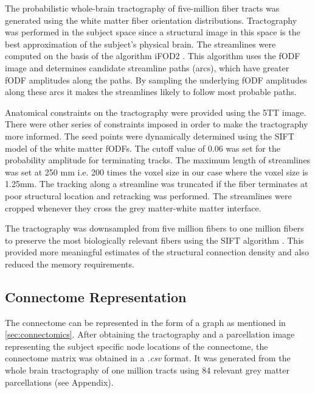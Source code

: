 \documentclass[msthesis.tex]{subfiles}
\begin{document}

The probabilistic whole-brain tractography of five-million fiber tracts was generated using the white matter fiber orientation distributions. Tractography was performed in the subject space since a structural image in this space is the best approximation of the subject's physical brain. The streamlines were computed on the basis of the algorithm iFOD2 \citep{tournier2010improved}. This algorithm uses the \gls{fODF} image and determines candidate streamline paths (arcs), which have greater \gls{fODF} amplitudes along the paths. By sampling the underlying \gls{fODF} amplitudes along these arcs it makes the streamlines likely to follow most probable paths.

Anatomical constraints on the tractography were provided using the \gls{5TT} image. There were other series of constraints imposed in order to make the  tractography more informed. The seed points were dynamically determined using the \gls{SIFT} model \citep{smith2013sift} of the white matter fODFs. The cutoff value of $0.06$ was set for the probability amplitude for terminating tracks. The maximum length of streamlines was set at 250 mm i.e. 200 times the voxel size in our case where the voxel size is 1.25mm. The tracking along a streamline was truncated if the fiber terminates at poor structural location and  retracking was performed. The streamlines were cropped whenever they cross the grey matter-white matter interface. 

The tractography was downsampled from five million fibers to one million fibers to preserve the most biologically relevant fibers using the SIFT algorithm \citep{smith2013sift}. This provided more meaningful estimates of the structural connection density and also reduced the memory requirements. 

\subsection{Connectome Representation}
\label{subsec:connectomegeneration}
The connectome can be represented in the form of a graph as mentioned in \autoref{sec:connectomics}. After obtaining the tractography and a parcellation image representing the subject specific node locations of the connectome, the connectome matrix was obtained in a \textit{.csv} format. It was generated from the whole brain tractography of one million tracts using 84 relevant grey matter parcellations (see   Appendix).
\end{document}
